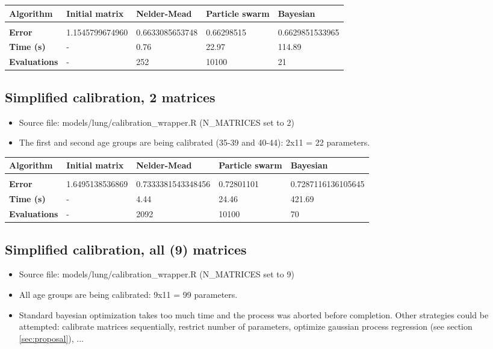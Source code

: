 \begin{table}[h]
	\begin{tabular}{p{2cm}|l|l|l|l}
		\textbf{Algorithm} 		& \textbf{Initial matrix} & \textbf{Nelder-Mead} 		& \textbf{Particle swarm} 	& \textbf{Bayesian} \\
		\hline \\
		\textbf{Error}	& 1.1545799674960& 0.6633085653748	& \cellcolor{green}0.66298515		& \cellcolor{green}0.6629851533965 \\
		\textbf{Time (s)} & - & \cellcolor{green}0.76 & 22.97 & \cellcolor{red!20}114.89 \\
		\textbf{Evaluations} & - & 252 & \cellcolor{red!20}10100 & \cellcolor{green}21 \\
	\end{tabular}
\end{table}

\subsection{Simplified calibration, 2 matrices}

\begin{itemize}
	\item Source file: models/lung/calibration\_wrapper.R (N\_MATRICES set to 2)
	\item The first and second age groups are being calibrated (35-39 and 40-44): 2x11 = 22 parameters.
\end{itemize}


\begin{table}[h]
	\begin{tabular}{p{2cm}|l|l|l|l}
		\textbf{Algorithm} 		& \textbf{Initial matrix} & \textbf{Nelder-Mead} 		& \textbf{Particle swarm} 	& \textbf{Bayesian} \\
		\hline \\
		\textbf{Error}	& 1.6495138536869 & 0.7333381543348456 & \cellcolor{green}0.72801101 & \cellcolor{green}0.7287116136105645 \\
		\textbf{Time (s)} & - & \cellcolor{green}4.44 & 24.46 & \cellcolor{red!20}421.69 \\
		\textbf{Evaluations} & - & 2092 & \cellcolor{green}10100 & \cellcolor{green}70 \\
	\end{tabular}
\end{table}

\subsection{Simplified calibration, all (9) matrices}
\begin{itemize}
    \item Source file: models/lung/calibration\_wrapper.R (N\_MATRICES set to 9)
	\item All age groups are being calibrated: 9x11 = 99 parameters.
	\item Standard bayesian optimization takes too much time and the process was aborted before completion. Other strategies could be attempted: calibrate matrices sequentially, restrict number of parameters, optimize gaussian process regression (see section \ref{sec:proposal}), ...
\end{itemize}

